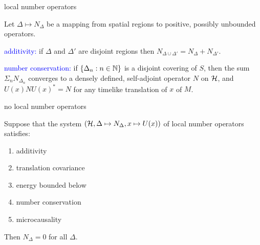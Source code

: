 \documentclass[8pt]{beamer}
\begin{document}
\begin{frame}{local number operators}

  Let $\Delta\mapsto N_\Delta$ be a mapping from spatial regions to
  positive, possibly unbounded operators.

  \bigskip \bigskip \textcolor{blue}{additivity:} if $\Delta$ and $\Delta '$ are
  disjoint regions then $N_{\Delta\cup\Delta '}=N_{\Delta}+N_{\Delta
    '}$.

  \bigskip \textcolor{blue}{number conservation:} if $\{ \Delta
  _n:n\in \mathbb N \}$ is a disjoint covering of $S$, then the sum $\Sigma
  _nN_{\Delta _n}$ converges to a densely defined, self-adjoint
  operator $N$ on $\mathcal H$, and $U(x)NU(x)^* = N$ for any timelike
  translation of $x$ of $M$.

 
\end{frame}


\begin{frame}{no local number operators}

  Suppose that the system $(\mathcal H ,\Delta\mapsto N_{\Delta},x\mapsto
  U(x))$ of local number operators satisfies:
\begin{enumerate}
\item additivity
\item translation covariance
\item energy bounded below
\item number conservation
\item microcausality
\end{enumerate}
\bigskip Then $N_{\Delta}=0$ for all $\Delta$.




\end{frame}
\end{document}
